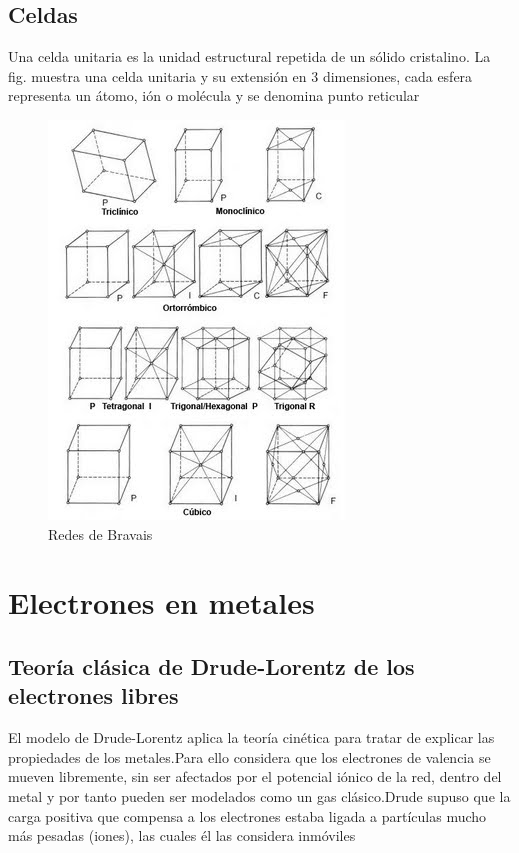\documentclass[oneside]{book}
\numberwithin{equation}{section}
\numberwithin{figure}{section}
\numberwithin{table}{section}
\begin{document}
		\section{Celdas}
		
			Una celda unitaria es la unidad estructural repetida de un sólido cristalino. La fig. muestra una celda unitaria y su extensión en 3 dimensiones, cada esfera representa un átomo, ión o molécula y se denomina punto reticular
	
			\begin{figure}[H]
				\begin{center}
					\includegraphics[scale=1]{Bravais.jpg}
					\caption{Redes de Bravais}
				\end{center}			
			\end{figure}
	
	\chapter{Electrones en metales}	
		\section{Teoría clásica de Drude-Lorentz de los electrones libres}	
		
			El modelo de Drude-Lorentz aplica la teoría cinética	para tratar de explicar las propiedades de los metales.Para ello considera que los electrones de valencia se mueven libremente, sin ser afectados por el potencial iónico de la red, dentro del metal y por tanto pueden ser modelados como un gas clásico.Drude supuso que la carga positiva que compensa a los electrones estaba ligada a partículas mucho más pesadas (iones), las cuales  él las considera inmóviles
		
\end{document}
